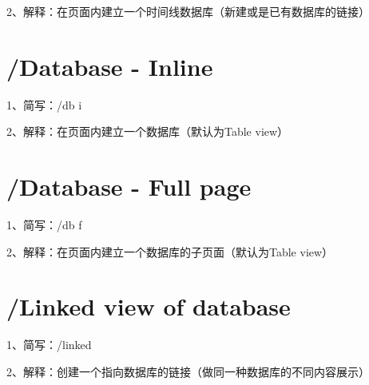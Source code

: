 2、解释：在页面内建立一个时间线数据库（新建或是已有数据库的链接）

\section{/Database - Inline}

1、简写：/db i

2、解释：在页面内建立一个数据库（默认为Table view）

\section{/Database - Full page}

1、简写：/db f

2、解释：在页面内建立一个数据库的子页面（默认为Table view）

\section{/Linked view of database}

1、简写：/linked

2、解释：创建一个指向数据库的链接（做同一种数据库的不同内容展示）

